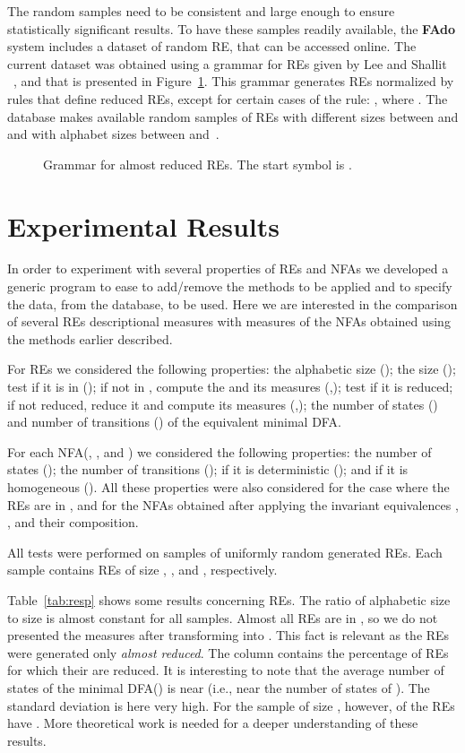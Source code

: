 \documentclass{llncs}
\newcommand{\FAdo}{{\bf FAdo}\xspace}
\newcommand{\dfa}{DFA\xspace}
\newcommand{\NFA}{NFA\xspace}
\newcommand{\nfas}{NFAs\xspace}
\newcommand{\re}{RE\xspace}
\newcommand{\res}{REs\xspace}
\newcommand{\snf}{\mbox{}\xspace}
\newcommand{\snfr}{\mbox{}\xspace}
\newcommand{\alphw}{\mbox{}\xspace}
\newcommand{\rpn}{\mbox{}\xspace}
\newcommand{\stc}{\mbox{}\xspace}
\newcommand{\ttc}{\mbox{}\xspace}
\newcommand{\isdet}{\mbox{}\xspace}
\newcommand{\ishom}{\mbox{}\xspace}
\begin{document}
The random samples need to be consistent and large enough to ensure
statistically significant results. To have these samples readily
available, the \FAdo system includes a dataset of random \re, that can
be accessed online. The current dataset was obtained using a grammar
for \res given by Lee and Shallit
~\cite{lee05:_enumer_regul_expres_and_their_languag_c}, and that is
presented in Figure~\ref{fig:grammar}. This grammar generates \res
normalized by rules that define reduced \res, except for certain cases
of the rule: , where
. The database makes available random
samples of \res with different sizes between  and  and with
alphabet sizes between  and~.
\begin{figure}
  \centering
  {\small}
  \caption{Grammar for almost reduced \res. The start symbol is .}
  \label{fig:grammar}
\end{figure}

\section{Experimental Results}

In order to experiment with several properties of \res and \nfas we
developed a generic program to ease to add/remove the methods to be
applied and to specify the data, from the database, to be used. Here
we are interested in the comparison of several \res descriptional
measures with measures of the \nfas obtained using the methods earlier
described.

For \res we considered the following properties: the alphabetic size
(\alphw); the \rpn size (\rpn); test if it is in \snf (\snf); if not in
\snf, compute the \snf and its measures (\alphw,\rpn); test if it is
reduced; if not reduced, reduce it and compute its measures
(\alphw,\rpn); the number of states (\stc) and number of transitions
(\ttc) of the equivalent minimal \dfa. 

For each \NFA (,
, and ) we considered the following properties: the
number of states (); the number of transitions (); if
it is deterministic (\isdet); and if it is homogeneous (\ishom). All
these properties were also considered for the case where the \res are
in \snf, and for the \nfas obtained after applying the invariant
equivalences , , and their composition.

All tests were performed on samples of  uniformly random
generated \res. Each sample contains \res of size , , 
and , respectively.

Table~\ref{tab:resp} shows some results concerning \res.  The ratio of
alphabetic size to \rpn size is almost constant for all
samples. Almost all \res are in \snf, so we do not
presented the measures after transforming into \snf. This fact is
relevant as the \res were generated only \emph{almost reduced}. The
column \snfr contains the percentage of \res for which their \snf are
reduced. It is interesting to note that the average number of states
of the minimal \dfa (\stc) is near \alphw{} (i.e., near the number of
states of ). The standard deviation is here very high. For
the sample of size , however,  of the \res have . More theoretical work is needed for a deeper
understanding of these results.
\end{document}
